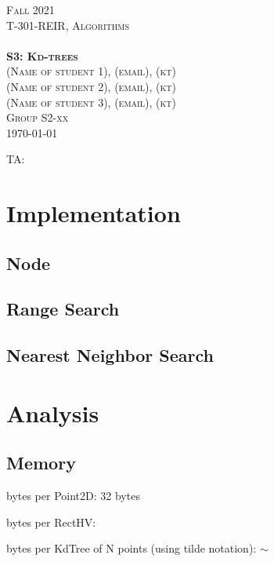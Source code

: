 \documentclass[11pt,a4paper,notitlepage]{article}
\newcommand{\semester}{Fall 2021}
\newcommand{\coursename}{Algorithms}
\newcommand{\courseid}{T-301-REIR}
\newcommand{\assignment}{S3: Kd-trees}
\newcommand{\dateofcompilation}{\today}
\newcommand{\maketitlepage}[1]
{
    \begin{titlepage}

        \begin{center}
            \textsc{\huge \semester}\\[0.8cm]

            {\textsc{\Huge \courseid, \coursename}}\\[0.4cm]
            \textsc{\LARGE }\\[2.5cm]

            \textbf{\textsc{\Huge #1}}\\[3cm]


            \textsc{\LARGE (Name of student 1), (email), (kt)}\\  %
            \textsc{\LARGE (Name of student 2), (email), (kt)}\\  %
            \textsc{\LARGE (Name of student 3), (email), (kt)}\\[0.6cm]  %
            \textsc{\LARGE Group S2-xx}\\[1cm]
            \textsc{\Large \dateofcompilation}


        \end{center}

        \vfill

        \begin{flushleft}
            \textsc{\Large TA: }   %

        \end{flushleft}

    \end{titlepage}
}
\newcommand{\explanation}[1]{}  %
\begin{document}
    \maketitlepage{\assignment}

\explanation{Directions on performing the assignment are showed here in italics (like this). These should not be included in the report you submit.}


\section{Implementation}

\subsection*{Node}

\explanation{Describe the Node data type you used to implement the
  2d-tree data structure.}

\subsection*{Range Search}
\explanation{Describe your method for range search in a kd-tree.}

\subsection*{Nearest Neighbor Search}
\explanation{Describe your method for nearest neighbor search in a kd-tree.}


\section{Analysis}

\subsection*{Memory}
\explanation{
   Give the total memory usage in bytes (using tilde notation and 
   the standard 64-bit memory cost model) of your 2d-tree data
   structure as a function of the number of points N. Justify your
   answer below.
% 
   Include the memory for all referenced objects (deep memory),
   including memory for the nodes, points, and rectangles.
}

bytes per Point2D: 32 bytes

bytes per RectHV:

bytes per KdTree of N points (using tilde notation):   $\sim$
\end{document}
